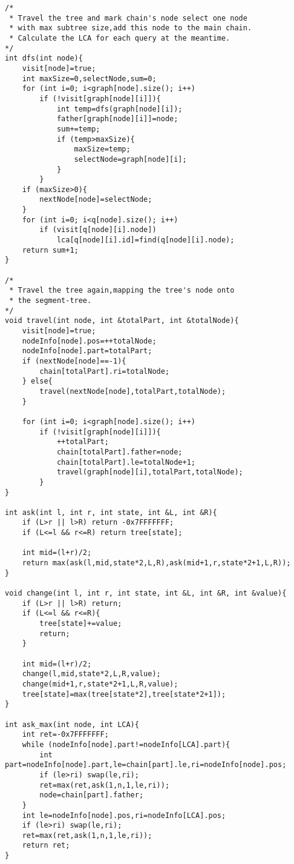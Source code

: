 \begin{verbatim}
/*
 * Travel the tree and mark chain's node select one node 
 * with max subtree size,add this node to the main chain.
 * Calculate the LCA for each query at the meantime.
*/
int dfs(int node){
    visit[node]=true;
    int maxSize=0,selectNode,sum=0;
    for (int i=0; i<graph[node].size(); i++)
        if (!visit[graph[node][i]]){
            int temp=dfs(graph[node][i]);
            father[graph[node][i]]=node;
            sum+=temp;
            if (temp>maxSize){
                maxSize=temp;
                selectNode=graph[node][i];
            }
        }
    if (maxSize>0){
        nextNode[node]=selectNode;
    }
    for (int i=0; i<q[node].size(); i++)
        if (visit[q[node][i].node])
            lca[q[node][i].id]=find(q[node][i].node);
    return sum+1;
}

/*
 * Travel the tree again,mapping the tree's node onto
 * the segment-tree.
*/
void travel(int node, int &totalPart, int &totalNode){
    visit[node]=true;
    nodeInfo[node].pos=++totalNode;
    nodeInfo[node].part=totalPart;
    if (nextNode[node]==-1){
        chain[totalPart].ri=totalNode;
    } else{
        travel(nextNode[node],totalPart,totalNode);
    }

    for (int i=0; i<graph[node].size(); i++)
        if (!visit[graph[node][i]]){
            ++totalPart;
            chain[totalPart].father=node;
            chain[totalPart].le=totalNode+1;
            travel(graph[node][i],totalPart,totalNode);
        }
}

int ask(int l, int r, int state, int &L, int &R){
    if (L>r || l>R) return -0x7FFFFFFF;
    if (L<=l && r<=R) return tree[state];

    int mid=(l+r)/2;
    return max(ask(l,mid,state*2,L,R),ask(mid+1,r,state*2+1,L,R));
}

void change(int l, int r, int state, int &L, int &R, int &value){
    if (L>r || l>R) return;
    if (L<=l && r<=R){
        tree[state]+=value;
        return;
    }
    
    int mid=(l+r)/2;
    change(l,mid,state*2,L,R,value);
    change(mid+1,r,state*2+1,L,R,value);
    tree[state]=max(tree[state*2],tree[state*2+1]);
}

int ask_max(int node, int LCA){
    int ret=-0x7FFFFFFF;
    while (nodeInfo[node].part!=nodeInfo[LCA].part){
        int part=nodeInfo[node].part,le=chain[part].le,ri=nodeInfo[node].pos;
        if (le>ri) swap(le,ri);
        ret=max(ret,ask(1,n,1,le,ri));
        node=chain[part].father;
    }
    int le=nodeInfo[node].pos,ri=nodeInfo[LCA].pos;
    if (le>ri) swap(le,ri);
    ret=max(ret,ask(1,n,1,le,ri));
    return ret;
}


\end{verbatim}

